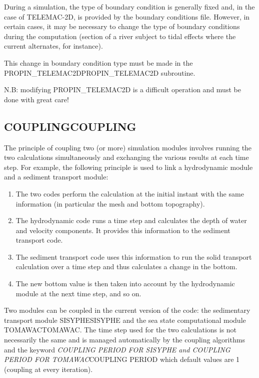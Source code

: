 \documentclass{article} %
\begin{document}
 During a simulation, the type of boundary condition is generally fixed and, in the case of TELEMAC-2D, is provided by the boundary conditions file. However, in certain cases, it may be necessary to change the type of boundary conditions during the computation (section of a river subject to tidal effects where the current alternates, for instance).

 This change in boundary condition type must be made in the PROPIN\_TELEMAC2DPROPIN\_TELEMAC2D subroutine.

 N.B: modifying PROPIN\_TELEMAC2D is a difficult operation and must be done with great care!


\subsection{ COUPLINGCOUPLING}

 The principle of coupling two (or more) simulation modules involves running the two calculations simultaneously and exchanging the various results at each time step. For example, the following principle is used to link a hydrodynamic module and a sediment transport module:

\begin{enumerate}
\item  The two codes perform the calculation at the initial instant with the same information (in particular the mesh and bottom topography).

\item  The hydrodynamic code runs a time step and calculates the depth of water and velocity components. It provides this information to the sediment transport code.

\item  The sediment transport code uses this information to run the solid transport calculation over a time step and thus calculates a change in the bottom.

\item  The new bottom value is then taken into account by the hydrodynamic module at the next time step, and so on.
\end{enumerate}

 Two modules can be coupled in the current version of the code: the sedimentary transport module SISYPHESISYPHE and the sea state computational module TOMAWACTOMAWAC. The time step used for the two calculations is not necessarily the same and is managed automatically by the coupling algorithms and the keyword \textit{COUPLING PERIOD FOR SISYPHE and COUPLING PERIOD FOR TOMAWAC}COUPLING PERIOD which default values are 1 (coupling at every iteration).
\end{document}
